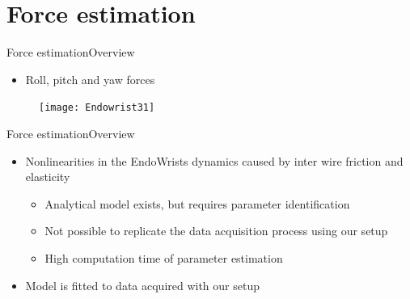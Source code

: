 \section{Force estimation}

\begin{frame}{Force estimation}{Overview}
\begin{itemize}
  	\item Roll, pitch and yaw forces
\end{itemize}
 \begin{figure}[h]
 \centering
 \texttt{[image: Endowrist31]}
 \label{fig:ewr}
 \end{figure}
\end{frame}

\begin{frame}{Force estimation}{Overview}
\begin{itemize}
\item Nonlinearities in the EndoWrists dynamics caused by inter wire friction and elasticity
\begin{itemize}
\item Analytical model exists, but requires parameter identification
\item Not possible to replicate the data acquisition process using our setup
\item High computation time of parameter estimation
\end{itemize}
\item Model is fitted to data acquired with our setup
\end{itemize}
\end{frame}


